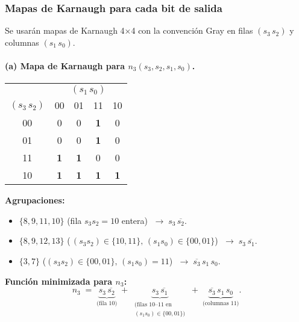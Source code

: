 \documentclass[12pt]{article}
\begin{document}
\bigskip


\subsubsection*{Mapas de Karnaugh para cada bit de salida}

Se usarán mapas de Karnaugh 4×4 con la convención Gray en filas \((s_3\,s_2)\) y columnas \((s_1\,s_0)\).  

\paragraph*{(a) Mapa de Karnaugh para \(n_{3}(s_{3},s_{2},s_{1},s_{0})\).}

\begin{center}
\begin{tabular}{c|cccc}
  \multicolumn{1}{c}{} & \multicolumn{4}{c}{\((s_{1}\,s_{0})\)} \\[-2pt]
  \cline{2-5}
  \((s_{3}\,s_{2})\) & 00 & 01 & 11 & 10 \\
  \cline{1-5}
  00 & 0 & 0 & \bf1 & 0 \\  %
  01 & 0 & 0 & \bf1 & 0 \\  %
  11 & \bf1 & \bf1 & 0 & 0 \\%
  10 & \bf1 & \bf1 & \bf1 & \bf1 \\ %
  \cline{1-5}
\end{tabular}
\end{center}

\noindent
\textbf{Agrupaciones:}
\begin{itemize}
  \item \(\{8,9,11,10\}\) (fila \(s_{3}s_{2}=10\) entera) \(\;\longrightarrow\; s_{3}\,\overline{s_{2}}\).
  \item \(\{8,9,12,13\}\) (\(\,(s_{3}s_{2})\in\{10,11\},\,(s_{1}s_{0})\in\{00,01\}\))  
    \(\;\longrightarrow\; s_{3}\,\overline{s_{1}}\).
  \item \(\{3,7\}\) (\((s_{3}s_{2})\in\{00,01\},\,(s_{1}s_{0})=11\))  
    \(\;\longrightarrow\; \overline{s_{3}}\,s_{1}\,s_{0}\).
\end{itemize}

\noindent
\textbf{Función minimizada para \(n_{3}\):}
\[
  n_{3} \;=\; 
    \underbrace{s_{3}\,\overline{s_{2}}}_{\text{(fila 10)}} 
    \;+\; 
    \underbrace{s_{3}\,\overline{s_{1}}}_{\substack{\text{(filas 10–11 en}\\(s_{1}s_{0})\in\{00,01\})}} 
    \;+\; 
    \underbrace{\overline{s_{3}}\,s_{1}\,s_{0}}_{\text{(columnas 11)}}.
\]
\end{document}
